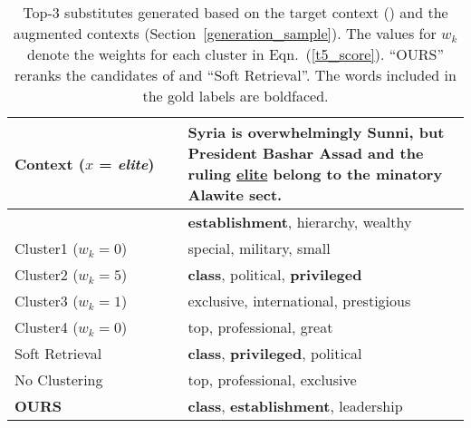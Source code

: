 \documentclass[11pt]{article}
\newcommand{\secref}[2][]{Section#1~\ref{#2}\xspace}
\newcommand{\eqnref}[2][]{Eqn#1.~(\ref{#2})\xspace}
\newcommand{\ex}[1]{\textit{#1}\xspace}
\begin{document}
\begin{table}[t!]
\begin{center}
\begin{adjustbox}{max width=\columnwidth}
\begin{tabular}{m{0.38\linewidth}m{0.79\linewidth}}
\toprule
\multicolumn{1}{l}{ Context ($x$ = \ex{elite}) }&Syria is overwhelmingly Sunni, but President Bashar Assad and the ruling \underline{elite} belong to the minatory Alawite sect.\\\midrule
\multicolumn{1}{l}{\citet{wada-etal-2022-unsupervised}} &\textbf{establishment}, hierarchy, wealthy%
\\\midrule
Cluster1 ($w_k=0$) &special, military, small%
\\
Cluster2 ($w_k=5$)&\textbf{class}, political, \textbf{privileged}%
\\
Cluster3 ($w_k=1$)&exclusive, international, prestigious%
\\
Cluster4 ($w_k=0$)&top, professional, great%
\\
\cmidrule{1-2}
\multirow{1}{*}{Soft Retrieval} &\textbf{class}, \textbf{privileged}, political%
\\
\multirow{1}{*}{No Clustering} &top, professional, exclusive%
\\\midrule
\textbf{OURS} &\textbf{class}, \textbf{establishment}, leadership%
\\

\bottomrule
\end{tabular}
\end{adjustbox}
\end{center}
\caption{Top-3 substitutes generated based on the target context (\citet{wada-etal-2022-unsupervised}) and the augmented contexts (\secref{generation_sample}). The values for $w_k$ denote the weights for each cluster in \eqnref{t5_score}. ``OURS'' reranks the candidates of \citet{wada-etal-2022-unsupervised} and ``Soft Retrieval''. The words included in the gold labels are boldfaced.}\label{ablation_example}
\end{table}
\end{document}
